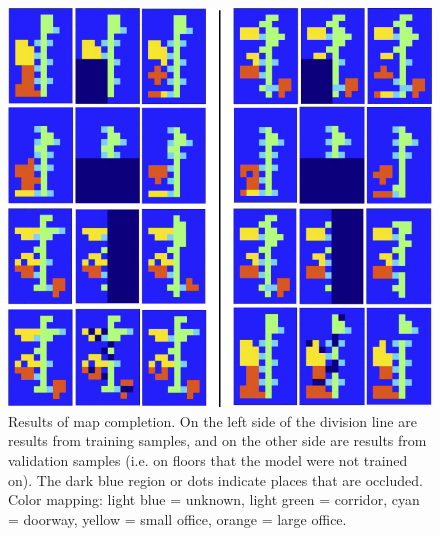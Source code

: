 \documentclass[10pt, titlepage]{article}
\theoremstyle{definition}
\begin{document}
\begin{figure}[!htb]
    \centering
    \captionsetup{width=.8\linewidth}
    \includegraphics[scale=0.75]{images/placegrid_completion.png}
    \caption{Results of map completion. On the left side of the division line are results from training samples, and on the other side are results from validation samples (i.e. on floors that the model were not trained on). The dark blue region or dots indicate places that are occluded. Color mapping: light blue = unknown, light green = corridor, cyan = doorway, yellow = small office, orange = large office.}
    \label{fig:basic_compl}
\end{figure}
\end{document}
